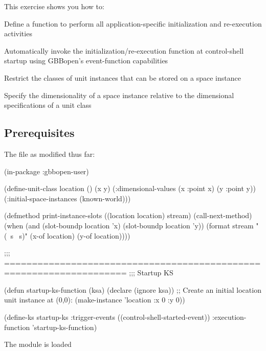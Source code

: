 \documentclass[10pt,twoside,english,pdftex]{article}
\begin{document}
\fndocrule

This exercise shows you how to:
\begin{tightitemize}
\item Define a function to perform all application-specific
  initialization and re-execution activities
\item Automatically invoke the initialization/re-execution function at 
  control-shell startup using GBBopen's event-function capabilities
\item Restrict the classes of unit instances that can be stored on a space 
  instance
\item Specify the dimensionality of a space instance relative to the
  dimensional specifications of a unit class
\end{tightitemize}

\fndocrule

\subsection*{Prerequisites}

\begin{tightitemize}
\item The  file as modified thus far:
\end{tightitemize}
%
\W\supp
\begin{example}
  (in-package :gbbopen-user)

  (define-unit-class location ()
    (x y)
    (:dimensional-values
      (x :point x)
      (y :point y))
    (:initial-space-instances (known-world)))

  (defmethod print-instance-slots ((location location) stream)
    (call-next-method)
    (when (and (slot-boundp location 'x)
               (slot-boundp location 'y))
      (format stream " (~s ~s)"
              (x-of location)
              (y-of location))))

  ;;; ====================================================================
  ;;;   Startup KS

  (defun startup-ks-function (ksa)
    (declare (ignore ksa))
    ;; Create an initial location unit instance at (0,0):
    (make-instance 'location :x 0 :y 0))

  (define-ks startup-ks
      :trigger-events ((control-shell-started-event))
      :execution-function 'startup-ks-function)
\end{example}

\begin{tightitemize}
\item The  module is loaded
\end{tightitemize}
\end{document}
